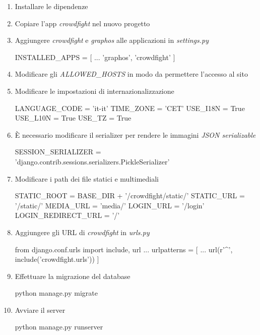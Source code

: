 \documentclass{scrreprt}
\begin{document}
\begin{enumerate}
\item Installare le dipendenze

\item Copiare l'app \textit{crowdfight} nel nuovo progetto

\item Aggiungere \textit{crowdfight} e \textit{graphos} alle applicazioni in \textit{settings.py}
\begin{python}
     INSTALLED_APPS = [
     	...
     	'graphos',
     	'crowdfight'
     ]
\end{python}

\item Modificare gli \textit{ALLOWED_HOSTS} in modo da permettere l'accesso al sito
\item Modificare le impostazioni di internazionalizzazione
\begin{python}
     LANGUAGE_CODE = 'it-it'
     TIME_ZONE = 'CET'
     USE_I18N = True
     USE_L10N = True
     USE_TZ = True
\end{python}

\item È necessario modificare il serializer per rendere le immagini \textit{JSON serializable}
\begin{python}
     SESSION_SERIALIZER =
     'django.contrib.sessions.serializers.PickleSerializer'
\end{python}

\item Modificare i path dei file statici e multimediali
\begin{python}
     STATIC_ROOT = BASE_DIR + '/crowdfight/static/'
     STATIC_URL = '/static/'
     MEDIA_URL = 'media/'
     LOGIN_URL = '/login'
     LOGIN_REDIRECT_URL = '/'
\end{python}

\item Aggiungere gli URL di \textit{crowdfight} in \textit{urls.py}
\begin{python}
     from django.conf.urls import include, url
     ...
     urlpatterns = [
     	...
     	url(r'^', include('crowdfight.urls'))
     ]
\end{python}

\item Effettuare la migrazione del database
\begin{python}
python manage.py migrate
\end{python}

\item Avviare il server
\begin{python}
python manage.py runserver
\end{python}

\end{enumerate}
\end{document}
